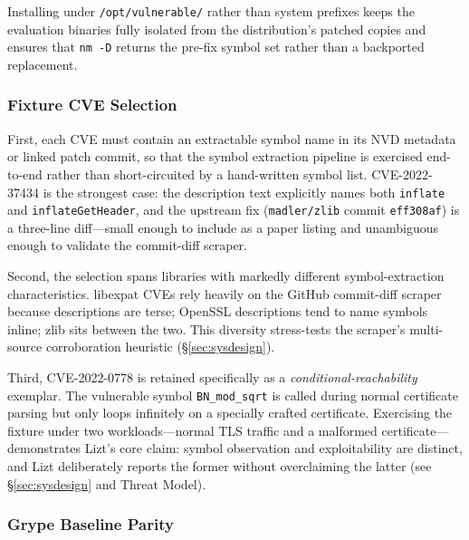 \documentclass[conference]{IEEEtran}
\begin{document}
Installing under \texttt{/opt/vulnerable/} rather than system prefixes keeps the evaluation binaries fully isolated from the distribution's patched copies and ensures that \texttt{nm -D} returns the pre-fix symbol set rather than a backported replacement.

\subsubsection{Fixture CVE Selection}

First, each CVE must contain an extractable symbol name in its NVD metadata or linked patch commit, so that the symbol extraction pipeline is exercised end-to-end rather than short-circuited by a hand-written symbol list. CVE-2022-37434 is the strongest case: the description text explicitly names both \texttt{inflate} and \texttt{inflateGetHeader}, and the upstream fix (\texttt{madler/zlib} commit \texttt{eff308af}) is a three-line diff---small enough to include as a paper listing and unambiguous enough to validate the commit-diff scraper.

Second, the selection spans libraries with markedly different symbol-extraction characteristics. libexpat CVEs rely heavily on the GitHub commit-diff scraper because descriptions are terse; OpenSSL descriptions tend to name symbols inline; zlib sits between the two. This diversity stress-tests the scraper's multi-source corroboration heuristic (\S\ref{sec:sysdesign}).

Third, CVE-2022-0778 is retained specifically as a \emph{conditional-reachability} exemplar. The vulnerable symbol \texttt{BN\_mod\_sqrt} is called during normal certificate parsing but only loops infinitely on a specially crafted certificate. Exercising the fixture under two workloads---normal TLS traffic and a malformed certificate---demonstrates Lizt's core claim: symbol observation and exploitability are distinct, and Lizt deliberately reports the former without overclaiming the latter (see \S\ref{sec:sysdesign} and Threat Model).

\subsubsection{Grype Baseline Parity}
\end{document}
